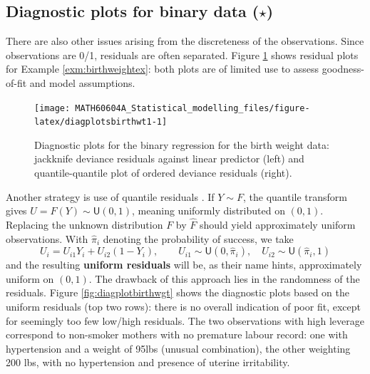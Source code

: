 \documentclass[
  11pt,
  letterpaper,
]{book}
\theoremstyle{definition}
\theoremstyle{definition}
\theoremstyle{definition}
\theoremstyle{remark}
\begin{document}
\hypertarget{diagnostic-plots-for-binary-data-star}{%
\subsection{\texorpdfstring{Diagnostic plots for binary data (\(\star\))}{Diagnostic plots for binary data (\textbackslash star)}}\label{diagnostic-plots-for-binary-data-star}}

There are also other issues arising from the discreteness of the observations. Since observations are 0/1, residuals are often separated. Figure \ref{fig:diagplotsbirthwt1}
shows residual plots for Example \ref{exm:birthweightex}: both plots are of limited use to assess goodness-of-fit and model assumptions.

\begin{figure}

{\centering \texttt{[image: MATH60604A\_Statistical\_modelling\_files/figure-latex/diagplotsbirthwt1-1]} 

}

\caption{Diagnostic plots for the binary regression for the birth weight data: jackknife deviance residuals against linear predictor (left) and quantile-quantile plot of ordered deviance residuals (right).}\label{fig:diagplotsbirthwt1}
\end{figure}

Another strategy is use of quantile residuals \citep{Brillinger/Preisler:1983}. If \(Y \sim F\), the quantile transform gives \(U=F(Y) \sim \mathsf{U}(0,1)\), meaning uniformly distributed on \((0,1)\). Replacing the unknown distribution \(F\) by \(\widehat{F}\) should yield approximately uniform observations. With \(\widehat{\pi}_i\) denoting the probability of success, we take
\[
U_i = U_{i1} Y_i + U_{i2}(1-Y_i), \qquad U_{i1} \sim \mathsf{U}(0, \widehat{\pi}_i), \quad U_{i2} \sim \mathsf{U}(\widehat{\pi}_i, 1)
\]
and the resulting \textbf{uniform residuals} will be, as their name hints, approximately uniform on \((0,1)\). The drawback of this approach lies in the randomness of the residuals.
Figure \ref{fig:diagplotbirthwgt} shows the diagnostic plots based on the uniform residuals (top two rows): there is no overall indication of poor fit, except for seemingly too few low/high residuals. The two observations with high leverage correspond to non-smoker mothers with no premature labour record: one with hypertension and a weight of 95lbs (unusual combination), the other weighting 200 lbs, with no hypertension and presence of uterine irritability.
\end{document}
